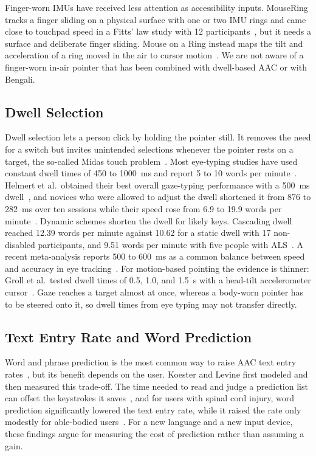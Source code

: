 \documentclass[journal]{IEEEtran}
\begin{document}
Finger-worn IMUs have received less attention as accessibility inputs. MouseRing tracks a finger sliding on a physical surface with one or two IMU rings and came close to touchpad speed in a Fitts' law study with 12 participants~\cite{shen2024}, but it needs a surface and deliberate finger sliding. Mouse on a Ring instead maps the tilt and acceleration of a ring moved in the air to cursor motion~\cite{zhao2021}. We are not aware of a finger-worn in-air pointer that has been combined with dwell-based AAC or with Bengali.

\subsection{Dwell Selection}
Dwell selection lets a person click by holding the pointer still. It removes the need for a switch but invites unintended selections whenever the pointer rests on a target, the so-called Midas touch problem~\cite{jacob1990}. Most eye-typing studies have used constant dwell times of 450 to 1000~ms and report 5 to 10 words per minute~\cite{majaranta2009}. Helmert et al.\ obtained their best overall gaze-typing performance with a 500~ms dwell~\cite{helmert2008}, and novices who were allowed to adjust the dwell shortened it from 876 to 282~ms over ten sessions while their speed rose from 6.9 to 19.9 words per minute~\cite{majaranta2009}. Dynamic schemes shorten the dwell for likely keys. Cascading dwell reached 12.39 words per minute against 10.62 for a static dwell with 17 non-disabled participants, and 9.51 words per minute with five people with ALS~\cite{mott2017}. A recent meta-analysis reports 500 to 600~ms as a common balance between speed and accuracy in eye tracking~\cite{burnham2025}. For motion-based pointing the evidence is thinner: Groll et al.\ tested dwell times of 0.5, 1.0, and 1.5~s with a head-tilt accelerometer cursor~\cite{groll2020}. Gaze reaches a target almost at once, whereas a body-worn pointer has to be steered onto it, so dwell times from eye typing may not transfer directly.

\subsection{Text Entry Rate and Word Prediction}
Word and phrase prediction is the most common way to raise AAC text entry rates~\cite{waller2025}, but its benefit depends on the user. Koester and Levine first modeled and then measured this trade-off. The time needed to read and judge a prediction list can offset the keystrokes it saves~\cite{koester1994}, and for users with spinal cord injury, word prediction significantly lowered the text entry rate, while it raised the rate only modestly for able-bodied users~\cite{koester1996}. For a new language and a new input device, these findings argue for measuring the cost of prediction rather than assuming a gain.
\end{document}
